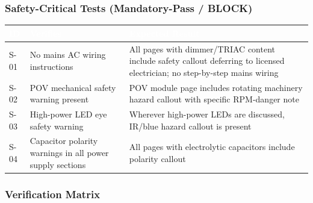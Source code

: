 \documentclass[11pt,letterpaper]{article}
\newcommand{\tableheader}[1]{\textbf{\sffamily\textcolor{white}{#1}}}
\begin{document}
\subsubsection{Safety-Critical Tests (Mandatory-Pass / BLOCK)}

\begin{center}
\begin{tabularx}{\textwidth}{L{1.5cm}L{4cm}X}
\toprule
{}
\tableheader{ID} & \tableheader{Verifies} & \tableheader{Expected Result} \\
\midrule
S-01 & No mains AC wiring instructions & All pages with dimmer/TRIAC content include safety callout deferring to licensed electrician; no step-by-step mains wiring \\
S-02 & POV mechanical safety warning present & POV module page includes rotating machinery hazard callout with specific RPM-danger note \\
S-03 & High-power LED eye safety warning & Wherever high-power LEDs are discussed, IR/blue hazard callout is present \\
S-04 & Capacitor polarity warnings in all power supply sections & All pages with electrolytic capacitors include polarity callout \\
\bottomrule
\end{tabularx}
\end{center}

\subsubsection{Verification Matrix}
\end{document}

